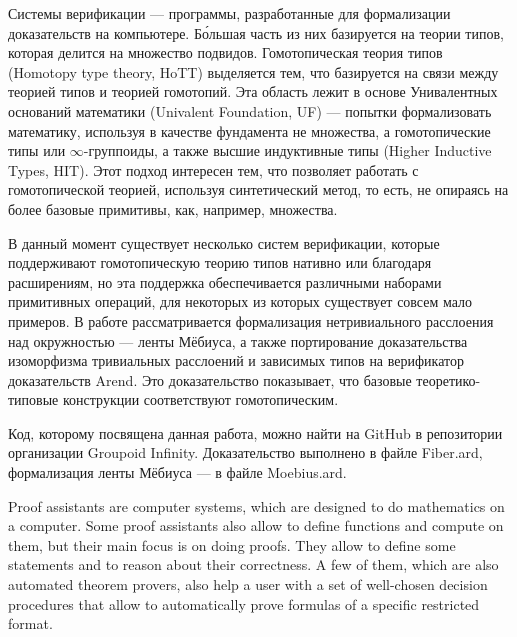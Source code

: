 




\Annot

Системы верификации --- программы, разработанные для формализации доказательств на компьютере. Б\'{о}льшая часть из них базируется на теории типов, которая делится на множество подвидов.
Гомотопическая теория типов (Homotopy type theory, HoTT) выделяется тем, что базируется на связи между теорией типов и теорией гомотопий. Эта область лежит в основе Унивалентных оснований математики (Univalent Foundation, UF) --- попытки формализовать математику, используя в качестве фундамента не множества, а гомотопические типы или $\infty$-группоиды, а также высшие индуктивные типы (Higher Inductive Types, HIT). Этот подход интересен тем, что позволяет работать с гомотопической теорией, используя синтетический метод, то есть, не опираясь на более базовые примитивы, как, например, множества.

В данный момент существует несколько систем верификации, которые поддерживают гомотопическую теорию типов нативно или благодаря расширениям, но эта поддержка обеспечивается различными наборами примитивных операций, для некоторых из которых существует совсем мало примеров.
В работе рассматривается формализация нетривиального расслоения над окружностью --- ленты Мёбиуса, а также портирование доказательства изоморфизма тривиальных расслоений и зависимых типов на верификатор доказательств Arend. Это доказательство показывает, что базовые теоретико-типовые конструкции соответствуют гомотопическим.

Код, которому посвящена данная работа, можно найти на GitHub\autocite{Grp1} в репозитории организации Groupoid Infinity. Доказательство выполнено в файле Fiber.ard\autocite{Fiber}, формализация ленты Мёбиуса --- в файле Moebius.ard\autocite{Moebius}.

\Introduction

Proof assistants are computer systems, which are designed to do mathematics on a computer. Some proof assistants also allow to define functions and compute on them, but their main focus is on doing proofs. They allow to define some statements and to reason about their correctness. A few of them, which are also automated theorem provers, also help a user with a set of well-chosen decision procedures that allow to automatically prove formulas of a specific restricted format\autocite{ProofAssistants1}.

